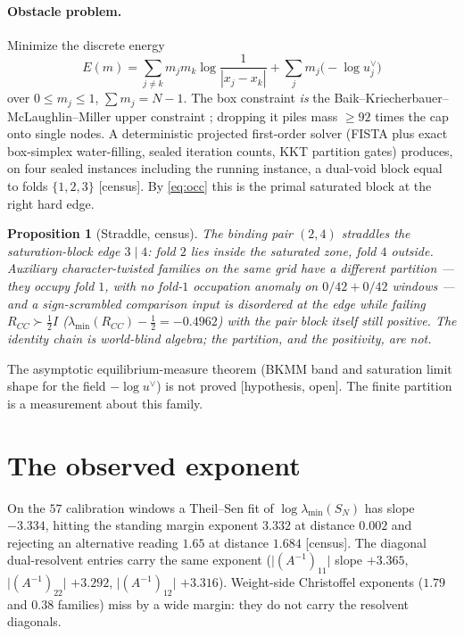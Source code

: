 \documentclass[11pt]{article}
\newtheorem{prop}{Proposition}
\theoremstyle{remark}
\newcommand{\half}{\tfrac12}
\newcommand{\gr}[1]{\textnormal{\small[#1]}}
\begin{document}
\paragraph{Obstacle problem.}
Minimize the discrete energy
\[
E(m)
=\sum_{j\neq k}m_{j}m_{k}\log\frac{1}{|x_{j}-x_{k}|}
+\sum_{j}m_{j}\bigl(-\log u^{\vee}_{j}\bigr)
\]
over $0\le m_{j}\le 1$, $\sum m_{j}=N-1$.  The box constraint
\emph{is} the Baik--Kriecherbauer--McLaughlin--Miller upper constraint
\cite{BKMM2007}; dropping it piles mass $\ge 92$ times the cap onto
single nodes.  A deterministic projected first-order solver
(FISTA plus exact box-simplex water-filling, sealed iteration
counts, KKT partition gates) produces, on four sealed instances
including the running instance, a dual-void block equal to folds
$\{1,2,3\}$ \gr{census}.  By \eqref{eq:occ} this is the primal
saturated block at the right hard edge.

\begin{prop}[Straddle, census]\label{prop:straddle}
The binding pair $(2,4)$ straddles the saturation-block edge $3\mid 4$:
fold $2$ lies inside the saturated zone, fold $4$ outside.
Auxiliary character-twisted families on the same grid have a
\emph{different} partition --- they occupy fold $1$, with no fold-$1$
occupation anomaly on $0/42+0/42$ windows --- and a sign-scrambled
comparison input is disordered at the edge while failing
$R_{CC}\succ\half I$ ($\lambda_{\min}(R_{CC})-\half=-0.4962$) with
the pair block itself still positive.  The identity chain is
world-blind algebra; the partition, and the positivity, are not.
\end{prop}

The asymptotic equilibrium-measure theorem (BKMM band and saturation
limit shape for the field $-\log u^{\vee}$) is not proved
\gr{hypothesis, open}.  The finite partition is a measurement about
this family.

\section{The observed exponent}\label{sec:alpha}

On the $57$ calibration windows a Theil--Sen fit of
$\log\lambda_{\min}(S_{N})$ has slope $-3.334$, hitting the standing
margin exponent $3.332$ at distance $0.002$ and rejecting an
alternative reading $1.65$ at distance $1.684$ \gr{census}.  The
diagonal dual-resolvent entries carry the same exponent
($\lvert(A^{-1})_{11}\rvert$ slope $+3.365$,
$\lvert(A^{-1})_{22}\rvert$ $+3.292$,
$\lvert(A^{-1})_{12}\rvert$ $+3.316$).  Weight-side Christoffel
exponents ($1.79$ and $0.38$ families) miss by a wide margin: they
do not carry the resolvent diagonals.
\end{document}
